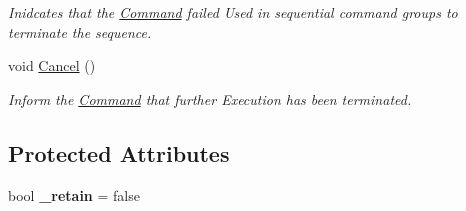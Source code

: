 \begin{DoxyCompactItemize}
\begin{DoxyCompactList}\small\item\em Inidcates that the \hyperlink{classstrange_1_1extensions_1_1command_1_1impl_1_1_command}{Command} failed Used in sequential command groups to terminate the sequence. \end{DoxyCompactList}\item 
\hypertarget{classstrange_1_1extensions_1_1command_1_1impl_1_1_command_a500dacf34f897fec9ad6930a24ec3332}{void \hyperlink{classstrange_1_1extensions_1_1command_1_1impl_1_1_command_a500dacf34f897fec9ad6930a24ec3332}{Cancel} ()}\label{classstrange_1_1extensions_1_1command_1_1impl_1_1_command_a500dacf34f897fec9ad6930a24ec3332}

\begin{DoxyCompactList}\small\item\em Inform the \hyperlink{classstrange_1_1extensions_1_1command_1_1impl_1_1_command}{Command} that further Execution has been terminated. \end{DoxyCompactList}\end{DoxyCompactItemize}
\subsection*{Protected Attributes}
\begin{DoxyCompactItemize}
\item 
\hypertarget{classstrange_1_1extensions_1_1command_1_1impl_1_1_command_a5af3d1e83f6f702ee7d4ca069efd348f}{bool {\bfseries \-\_\-retain} = false}\label{classstrange_1_1extensions_1_1command_1_1impl_1_1_command_a5af3d1e83f6f702ee7d4ca069efd348f}

\end{DoxyCompactItemize}
